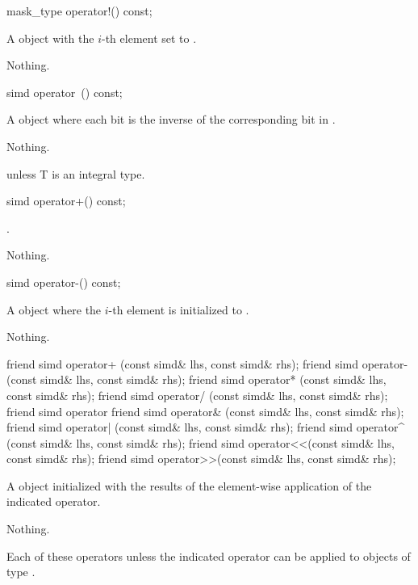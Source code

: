 \begin{itemdecl}
mask_type operator!() const;
\end{itemdecl}
\begin{itemdescr}
  \pnum\returns A \mask object with the $i$-th element set to  \foralli.

  \pnum\throws Nothing.
\end{itemdescr}

\begin{itemdecl}
simd operator~() const;
\end{itemdecl}
\begin{itemdescr}
  \pnum\returns A \simd object where each bit is the inverse of the corresponding bit in .

  \pnum\throws Nothing.

  \pnum\remarks \simd{} \specialsfinae unless \type T is an integral type.
\end{itemdescr}

\begin{itemdecl}
simd operator+() const;
\end{itemdecl}
\begin{itemdescr}
  \pnum\returns {}.

  \pnum\throws Nothing.
\end{itemdescr}

\begin{itemdecl}
simd operator-() const;
\end{itemdecl}
\begin{itemdescr}
  \pnum\returns A \simd object where the $i$-th element is initialized to  \foralli.

  \pnum\throws Nothing.
\end{itemdescr}


\begin{itemdecl}
friend simd operator+ (const simd& lhs, const simd& rhs);
friend simd operator- (const simd& lhs, const simd& rhs);
friend simd operator* (const simd& lhs, const simd& rhs);
friend simd operator/ (const simd& lhs, const simd& rhs);
friend simd operator%
friend simd operator& (const simd& lhs, const simd& rhs);
friend simd operator| (const simd& lhs, const simd& rhs);
friend simd operator^ (const simd& lhs, const simd& rhs);
friend simd operator<<(const simd& lhs, const simd& rhs);
friend simd operator>>(const simd& lhs, const simd& rhs);
\end{itemdecl}
\begin{itemdescr}
  \pnum\returns A \simd object initialized with the results of the element-wise application of the indicated operator.

  \pnum\throws Nothing.

  \pnum\remarks Each of these operators \specialsfinae unless the indicated operator can be applied to objects of type .
\end{itemdescr}

